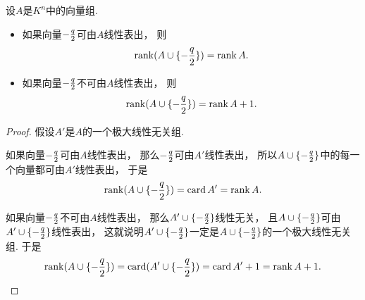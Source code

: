\begin{proposition}\label{theorem:向量组的秩.并集的秩}
设\(A\)是\(K^n\)中的向量组.
\begin{itemize}
	\item 如果向量\(-\frac{q}{2}\)可由\(A\)线性表出，
	则\[
		\rank(A \cup \{-\frac{q}{2}\}) = \rank A.
	\]

	\item 如果向量\(-\frac{q}{2}\)不可由\(A\)线性表出，
	则\[
		\rank(A \cup \{-\frac{q}{2}\}) = \rank A + 1.
	\]
\end{itemize}
\begin{proof}
假设\(A'\)是\(A\)的一个极大线性无关组.

如果向量\(-\frac{q}{2}\)可由\(A\)线性表出，
那么\(-\frac{q}{2}\)可由\(A'\)线性表出，
所以\(A \cup \{-\frac{q}{2}\}\)中的每一个向量都可由\(A'\)线性表出，
于是\[
	\rank(A \cup \{-\frac{q}{2}\})
	= \operatorname{card} A'
	= \rank A.
\]

如果向量\(-\frac{q}{2}\)不可由\(A\)线性表出，
那么\(A' \cup \{-\frac{q}{2}\}\)线性无关，
且\(A \cup \{-\frac{q}{2}\}\)可由\(A' \cup \{-\frac{q}{2}\}\)线性表出，
这就说明\(A' \cup \{-\frac{q}{2}\}\)一定是\(A \cup \{-\frac{q}{2}\}\)的一个极大线性无关组.
于是\[
	\rank(A \cup \{-\frac{q}{2}\})
	= \operatorname{card}(A' \cup \{-\frac{q}{2}\})
	= \operatorname{card} A' + 1
	= \rank A + 1.
	\qedhere
\]
\end{proof}
\end{proposition}


